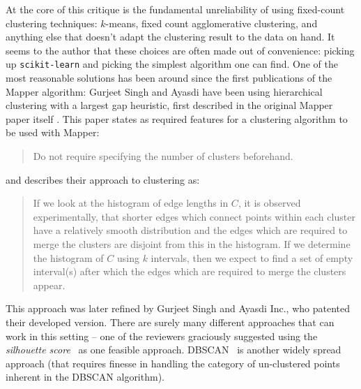 \documentclass{amsart}
\begin{document}
At the core of this critique is the fundamental unreliability of using fixed-count clustering techniques: $k$-means, fixed count agglomerative clustering, and anything else that doesn't adapt the clustering result to the data on hand.
It seems to the author that these choices are often made out of convenience: picking up \texttt{scikit-learn} and picking the simplest algorithm one can find.
One of the most reasonable solutions has been around since the first publications of the Mapper algorithm: Gurjeet Singh and Ayasdi have been using hierarchical clustering with a largest gap heuristic, first described in the original Mapper paper itself \citep{singh2007topological}.
This paper states as required features for a clustering algorithm to be used with Mapper:
\begin{quote}
    Do not require specifying the number of clusters beforehand.
\end{quote}
and describes their approach to clustering as:
\begin{quote}
    If we look at
the histogram of edge lengths in $C$, it is observed experimentally, that shorter edges which connect points within each
cluster have a relatively smooth distribution and the edges
which are required to merge the clusters are disjoint from
this in the histogram. If we determine the histogram of $C$
using $k$ intervals, then we expect to find a set of empty interval(s) after which the edges which are required to merge
the clusters appear.
\end{quote}

This approach was later refined by Gurjeet Singh and Ayasdi Inc., who patented their developed version.
There are surely many different approaches that can work in this setting -- one of the reviewers graciously suggested using the \emph{silhouette score}~\citep{rousseeuw1987silhouettes} as one feasible approach. DBSCAN~\citep{el2004efficient} is another widely spread approach (that requires finesse in handling the category of un-clustered points inherent in the DBSCAN algorithm).

\clearpage


\end{document}

